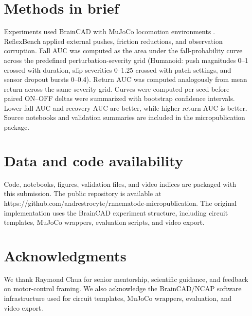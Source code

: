 \documentclass[11pt]{article}
\begin{document}
\section*{Methods in brief}
Experiments used BrainCAD with MuJoCo locomotion environments \citep{todorov2012mujoco,brockman2016openai}.  ReflexBench applied external pushes, friction reductions, and observation corruption.  Fall AUC was computed as the area under the fall-probability curve across the predefined perturbation-severity grid (Humanoid: push magnitudes 0--1 crossed with duration, slip severities 0--1.25 crossed with patch settings, and sensor dropout bursts 0--0.4).  Return AUC was computed analogously from mean return across the same severity grid.  Curves were computed per seed before paired ON--OFF deltas were summarized with bootstrap confidence intervals.  Lower fall AUC and recovery AUC are better, while higher return AUC is better.  Source notebooks and validation summaries are included in the micropublication package.

\section*{Data and code availability}
Code, notebooks, figures, validation files, and video indices are packaged with this submission.  The public repository is available at https://github.com/andrestrocyte/rnnematode-micropublication.  The original implementation uses the BrainCAD experiment structure, including circuit templates, MuJoCo wrappers, evaluation scripts, and video export.

\section*{Acknowledgments}
We thank Raymond Chua for senior mentorship, scientific guidance, and feedback on motor-control framing.  We also acknowledge the BrainCAD/NCAP software infrastructure used for circuit templates, MuJoCo wrappers, evaluation, and video export.



\end{document}
